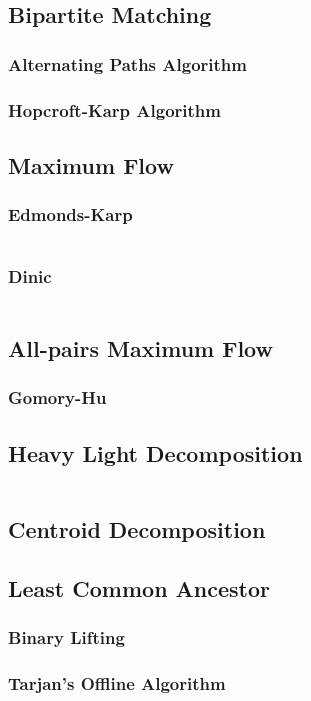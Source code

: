 \documentclass[8pt,a4paper,landscape,oneside]{amsart}
\newcommand{\code}[1]{\inputminted[fontsize=\normalsize,baselinestretch=1]{cpp}{_code/#1}}
\begin{document}
\begin{multicols*}{3}
	\subsection{Bipartite Matching}
		\subsubsection{Alternating Paths Algorithm}
		\subsubsection{Hopcroft-Karp Algorithm}
	\subsection{Maximum Flow}
		\subsubsection{Edmonds-Karp}
			\code{graphs/edmonds_karp.cpp}
		\subsubsection{Dinic}
			\code{graphs/dinic.cpp}
  \subsection{All-pairs Maximum Flow}
    \subsubsection{Gomory-Hu}
  \subsection{Heavy Light Decomposition}
    \code{graphs/heavy_light_decomposition.cpp}
	\subsection{Centroid Decomposition}
	\subsection{Least Common Ancestor}
		\subsubsection{Binary Lifting}
		\subsubsection{Tarjan's Offline Algorithm}

\end{multicols*}
\end{document}
